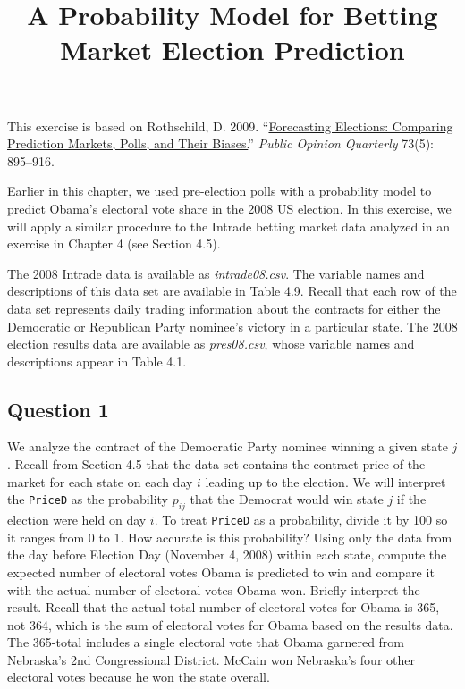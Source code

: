 \documentclass[]{article}
\title{A Probability Model for Betting Market Election Prediction}
\author{}
\date{}
\begin{document}
\maketitle


This exercise is based on Rothschild, D. 2009.
``\href{http://dx.doi.org/10.1093/poq/nfp082}{Forecasting Elections:
Comparing Prediction Markets, Polls, and Their Biases.}'' \emph{Public
Opinion Quarterly} 73(5): 895--916.

Earlier in this chapter, we used pre-election polls with a probability
model to predict Obama's electoral vote share in the 2008 US election.
In this exercise, we will apply a similar procedure to the Intrade
betting market data analyzed in an exercise in Chapter 4 (see Section
4.5).

The 2008 Intrade data is available as \emph{intrade08.csv}. The variable
names and descriptions of this data set are available in Table 4.9.
Recall that each row of the data set represents daily trading
information about the contracts for either the Democratic or Republican
Party nominee's victory in a particular state. The 2008 election results
data are available as \emph{pres08.csv}, whose variable names and
descriptions appear in Table 4.1.

\subsection{Question 1}\label{question-1}

We analyze the contract of the Democratic Party nominee winning a given
state $j$. Recall from Section 4.5 that the data set contains the
contract price of the market for each state on each day $i$ leading up
to the election. We will interpret the \texttt{PriceD} as the
probability $p_{ij}$ that the Democrat would win state $j$ if the
election were held on day $i$. To treat \texttt{PriceD} as a
probability, divide it by 100 so it ranges from 0 to 1. How accurate is
this probability? Using only the data from the day before Election Day
(November 4, 2008) within each state, compute the expected number of
electoral votes Obama is predicted to win and compare it with the actual
number of electoral votes Obama won. Briefly interpret the result.
Recall that the actual total number of electoral votes for Obama is 365,
not 364, which is the sum of electoral votes for Obama based on the
results data. The 365-total includes a single electoral vote that Obama
garnered from Nebraska's 2nd Congressional District. McCain won
Nebraska's four other electoral votes because he won the state overall.
\end{document}
